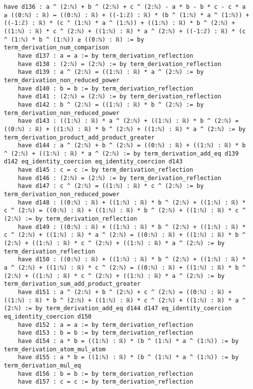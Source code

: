 \documentclass{article}
\begin{document}
\begin{tcolorbox}[colback=white!10, width=\linewidth]
\begin{lstlisting}[language=Lean4]
    have d136 : a ^ (2:ℕ) + b ^ (2:ℕ) + c ^ (2:ℕ) - a * b - b * c - c * a ≥ ((0:ℕ) : ℝ) ↔ ((0:ℕ) : ℝ) + ((-1:ℤ) : ℝ) * (b ^ (1:ℕ) * a ^ (1:ℕ)) + ((-1:ℤ) : ℝ) * (c ^ (1:ℕ) * a ^ (1:ℕ)) + ((1:ℕ) : ℝ) * b ^ (2:ℕ) + ((1:ℕ) : ℝ) * c ^ (2:ℕ) + ((1:ℕ) : ℝ) * a ^ (2:ℕ) + ((-1:ℤ) : ℝ) * (c ^ (1:ℕ) * b ^ (1:ℕ)) ≥ ((0:ℕ) : ℝ) := by term_derivation_num_comparison
    have d137 : a = a := by term_derivation_reflection
    have d138 : (2:ℕ) = (2:ℕ) := by term_derivation_reflection
    have d139 : a ^ (2:ℕ) = ((1:ℕ) : ℝ) * a ^ (2:ℕ) := by term_derivation_non_reduced_power
    have d140 : b = b := by term_derivation_reflection
    have d141 : (2:ℕ) = (2:ℕ) := by term_derivation_reflection
    have d142 : b ^ (2:ℕ) = ((1:ℕ) : ℝ) * b ^ (2:ℕ) := by term_derivation_non_reduced_power
    have d143 : ((1:ℕ) : ℝ) * a ^ (2:ℕ) + ((1:ℕ) : ℝ) * b ^ (2:ℕ) = ((0:ℕ) : ℝ) + ((1:ℕ) : ℝ) * b ^ (2:ℕ) + ((1:ℕ) : ℝ) * a ^ (2:ℕ) := by term_derivation_product_add_product_greater
    have d144 : a ^ (2:ℕ) + b ^ (2:ℕ) = ((0:ℕ) : ℝ) + ((1:ℕ) : ℝ) * b ^ (2:ℕ) + ((1:ℕ) : ℝ) * a ^ (2:ℕ) := by term_derivation_add_eq d139 d142 eq_identity_coercion eq_identity_coercion d143
    have d145 : c = c := by term_derivation_reflection
    have d146 : (2:ℕ) = (2:ℕ) := by term_derivation_reflection
    have d147 : c ^ (2:ℕ) = ((1:ℕ) : ℝ) * c ^ (2:ℕ) := by term_derivation_non_reduced_power
    have d148 : ((0:ℕ) : ℝ) + ((1:ℕ) : ℝ) * b ^ (2:ℕ) + ((1:ℕ) : ℝ) * c ^ (2:ℕ) = ((0:ℕ) : ℝ) + ((1:ℕ) : ℝ) * b ^ (2:ℕ) + ((1:ℕ) : ℝ) * c ^ (2:ℕ) := by term_derivation_reflection
    have d149 : ((0:ℕ) : ℝ) + ((1:ℕ) : ℝ) * b ^ (2:ℕ) + ((1:ℕ) : ℝ) * c ^ (2:ℕ) + ((1:ℕ) : ℝ) * a ^ (2:ℕ) = ((0:ℕ) : ℝ) + ((1:ℕ) : ℝ) * b ^ (2:ℕ) + ((1:ℕ) : ℝ) * c ^ (2:ℕ) + ((1:ℕ) : ℝ) * a ^ (2:ℕ) := by term_derivation_reflection
    have d150 : ((0:ℕ) : ℝ) + ((1:ℕ) : ℝ) * b ^ (2:ℕ) + ((1:ℕ) : ℝ) * a ^ (2:ℕ) + ((1:ℕ) : ℝ) * c ^ (2:ℕ) = ((0:ℕ) : ℝ) + ((1:ℕ) : ℝ) * b ^ (2:ℕ) + ((1:ℕ) : ℝ) * c ^ (2:ℕ) + ((1:ℕ) : ℝ) * a ^ (2:ℕ) := by term_derivation_sum_add_product_greater
    have d151 : a ^ (2:ℕ) + b ^ (2:ℕ) + c ^ (2:ℕ) = ((0:ℕ) : ℝ) + ((1:ℕ) : ℝ) * b ^ (2:ℕ) + ((1:ℕ) : ℝ) * c ^ (2:ℕ) + ((1:ℕ) : ℝ) * a ^ (2:ℕ) := by term_derivation_add_eq d144 d147 eq_identity_coercion eq_identity_coercion d150
    have d152 : a = a := by term_derivation_reflection
    have d153 : b = b := by term_derivation_reflection
    have d154 : a * b = ((1:ℕ) : ℝ) * (b ^ (1:ℕ) * a ^ (1:ℕ)) := by term_derivation_atom_mul_atom
    have d155 : a * b = ((1:ℕ) : ℝ) * (b ^ (1:ℕ) * a ^ (1:ℕ)) := by term_derivation_mul_eq
    have d156 : b = b := by term_derivation_reflection
    have d157 : c = c := by term_derivation_reflection

\end{lstlisting}
\end{tcolorbox}
\end{document}
